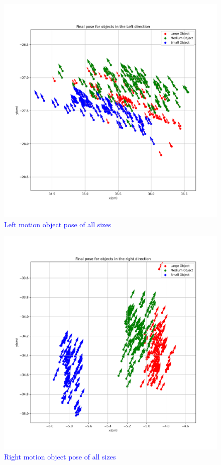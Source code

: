         \begin{figure}[H] 
            \centering \includegraphics[width=\textwidth]{"images/experiment_5/Final_pose_for_objects_of_different_size_left.png"}
            \caption{\textcolor{blue}{Left motion object pose of all sizes}}
            \label{fig:exp05-left-end-poses-all-size}
    \end{figure}
    
    
        \begin{figure}[H] 
            \centering \includegraphics[width=\textwidth]{"images/experiment_5/Final_pose_for_objects_of_different_size_right.png"}
            \caption{\textcolor{blue}{Right motion object pose of all sizes}}
            \label{fig:exp05-right-end-all-size}
    \end{figure}
    
